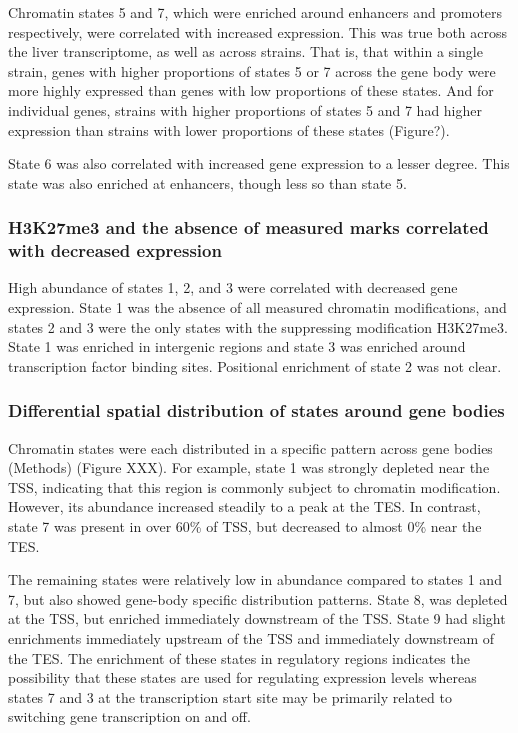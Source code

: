 \documentclass[10pt,letterpaper]{article}
\begin{document}
Chromatin states 5 and 7, which were enriched around enhancers and
promoters respectively, were correlated with increased expression. This
was true both across the liver transcriptome, as well as across strains.
That is, that within a single strain, genes with higher proportions of
states 5 or 7 across the gene body were more highly expressed than genes
with low proportions of these states. And for individual genes, strains
with higher proportions of states 5 and 7 had higher expression than
strains with lower proportions of these states (Figure?).

State 6 was also correlated with increased gene expression to a lesser
degree. This state was also enriched at enhancers, though less so than
state 5.

\hypertarget{h3k27me3-and-the-absence-of-measured-marks-correlated-with-decreased-expression}{%
\subsubsection{H3K27me3 and the absence of measured marks correlated
with decreased
expression}\label{h3k27me3-and-the-absence-of-measured-marks-correlated-with-decreased-expression}}

High abundance of states 1, 2, and 3 were correlated with decreased gene
expression. State 1 was the absence of all measured chromatin
modifications, and states 2 and 3 were the only states with the
suppressing modification H3K27me3. State 1 was enriched in intergenic
regions and state 3 was enriched around transcription factor binding
sites. Positional enrichment of state 2 was not clear.

\hypertarget{differential-spatial-distribution-of-states-around-gene-bodies}{%
\subsubsection{Differential spatial distribution of states around gene
bodies}\label{differential-spatial-distribution-of-states-around-gene-bodies}}

Chromatin states were each distributed in a specific pattern across gene
bodies (Methods) (Figure XXX). For example, state 1 was strongly
depleted near the TSS, indicating that this region is commonly subject
to chromatin modification. However, its abundance increased steadily to
a peak at the TES. In contrast, state 7 was present in over 60\% of TSS,
but decreased to almost 0\% near the TES.

The remaining states were relatively low in abundance compared to states
1 and 7, but also showed gene-body specific distribution patterns. State
8, was depleted at the TSS, but enriched immediately downstream of the
TSS. State 9 had slight enrichments immediately upstream of the TSS and
immediately downstream of the TES. The enrichment of these states in
regulatory regions indicates the possibility that these states are used
for regulating expression levels whereas states 7 and 3 at the
transcription start site may be primarily related to switching gene
transcription on and off.
\end{document}

